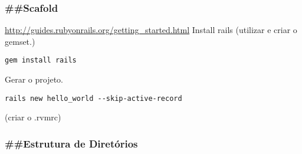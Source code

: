 \documentclass[serif,mathserif]{article}
\begin{document}
\subsubsection{\#\#Scafold}

\url{http://guides.rubyonrails.org/getting_started.html}
Install rails (utilizar e criar o gemset.)

\begin{verbatim}
gem install rails
\end{verbatim}

Gerar o projeto.
\begin{verbatim}
rails new hello_world --skip-active-record
\end{verbatim}

(criar o .rvmrc)

\subsubsection{\#\#Estrutura de Diretórios}
\end{document}
